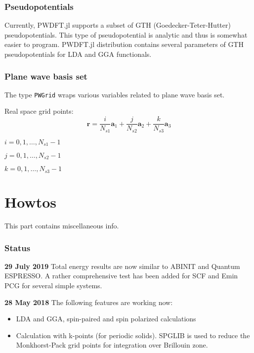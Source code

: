 \documentclass[a4paper,10pt]{article}
\newcommand{\jlinline}[1]{\texttt{#1}}
\begin{document}
\section{Pseudopotentials}
%
Currently, \textsf{PWDFT.jl} supports a subset of GTH (Goedecker-Teter-Hutter)
pseudopotentials. This type of pseudopotential is analytic and thus is somewhat
easier to program.
%
\textsf{PWDFT.jl} distribution contains several parameters
of GTH pseudopotentials for LDA and GGA functionals.



\section{Plane wave basis set}

The type \jlinline{PWGrid} wraps various variables related to plane wave basis
set.

Real space grid points:
$$
\mathbf{r} = \frac{i}{N_{s1}}\mathbf{a}_{1} + \frac{j}{N_{s2}}\mathbf{a}_{2} +
\frac{k}{N_{s3}}\mathbf{a}_{3}
$$

$i = 0,1,\ldots,N_{s1}-1$

$j = 0,1,\ldots,N_{s2}-1$

$k = 0,1,\ldots,N_{s3}-1$


\part{Howtos}

This part contains miscellaneous info.




\section*{Status}

\textbf{29 July 2019} Total energy results are now similar to ABINIT
and Quantum ESPRESSO. A rather comprehensive test has been added
for SCF and Emin PCG for several simple systems.


\textbf{28 May 2018} The following features are working now:
\begin{itemize}
\item LDA and GGA, spin-paired and spin polarized calculations
\item Calculation with k-points (for periodic solids).
  \textsf{SPGLIB} is used to reduce the Monkhorst-Pack grid points
  for integration over Brillouin zone.
\end{itemize}
\end{document}
